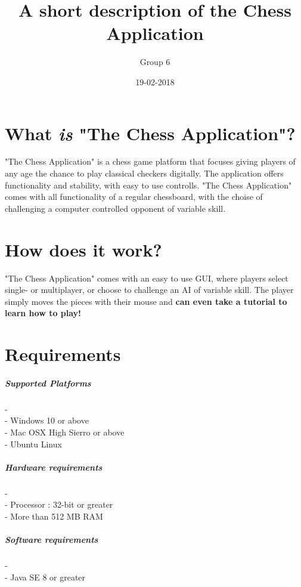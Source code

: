 \documentclass{article}
\title{A short description of the Chess Application}
\author{Group 6}
\date{19-02-2018}
\begin{document}
\maketitle

\section{What \textit{is} "The Chess Application"?}

"The Chess Application" is a chess game platform that focuses giving players of any
age the chance to play classical checkers digitally. The application offers functionality and 
stability, with easy to use controlls. "The Chess Application" comes with all functionality of a 
regular chessboard, with the choise of challenging a computer controlled opponent of variable
skill.

\section{How does it work?}

"The Chess Application" comes with an easy to use GUI, where players select single- or multiplayer,
or choose to challenge an AI of variable skill. The player simply moves the pieces with their mouse
and \textbf{can even take a tutorial to learn how to play!}\\

\section{Requirements}
\subparagraph{Supported Platforms}
-\\
- Windows 10 or above \\
- Mac OSX High Sierro or above \\
- Ubuntu Linux
\subparagraph{Hardware requirements}
- \\
- Processor : 32-bit or greater \\
- More than 512 MB RAM
\subparagraph{Software requirements}
-\\
- Java SE 8 or greater
\end{document}
